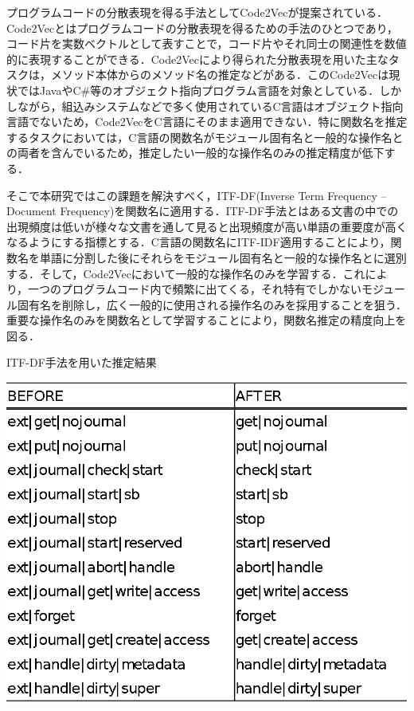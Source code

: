 \documentclass[submit,techrep,noauthor]{ipsj}
\begin{document}
プログラムコードの分散表現を得る手法としてCode2Vec\cite{alon2019code2vec}が提案されている．Code2Vecとはプログラムコードの分散表現を得るための手法のひとつであり，コード片を実数ベクトルとして表すことで，コード片やそれ同士の関連性を数値的に表現することができる．Code2Vecにより得られた分散表現を用いた主なタスクは，メソッド本体からのメソッド名の推定などがある．このCode2Vecは現状ではJavaやC\#等のオブジェクト指向プログラム言語を対象としている．しかしながら，組込みシステムなどで多く使用されているC言語はオブジェクト指向言語でないため，Code2VecをC言語にそのまま適用できない．特に関数名を推定するタスクにおいては，C言語の関数名がモジュール固有名と一般的な操作名との両者を含んでいるため，推定したい一般的な操作名のみの推定精度が低下する．

そこで本研究ではこの課題を解決すべく，ITF-DF(Inverse Term Frequency – Document Frequency)\cite{XXX}を関数名に適用する．ITF-DF手法とはある文書の中での出現頻度は低いが様々な文書を通して見ると出現頻度が高い単語の重要度が高くなるようにする指標とする．C言語の関数名にITF-IDF適用することにより，関数名を単語に分割した後にそれらをモジュール固有名と一般的な操作名とに選別する．そして，Code2Vecにおいて一般的な操作名のみを学習する．これにより，一つのプログラムコード内で頻繁に出てくる，それ特有でしかないモジュール固有名を削除し，広く一般的に使用される操作名のみを採用することを狙う．重要な操作名のみを関数名として学習することにより，関数名推定の精度向上を図る．

\begin{table}[t]
 \centering
 \caption{ITF-DF手法を用いた推定結果}
 \includegraphics[width=1.0\hsize]{image/ITF-DFcompare.eps} 
 \label{table1} 
\end{table}
\end{document}
